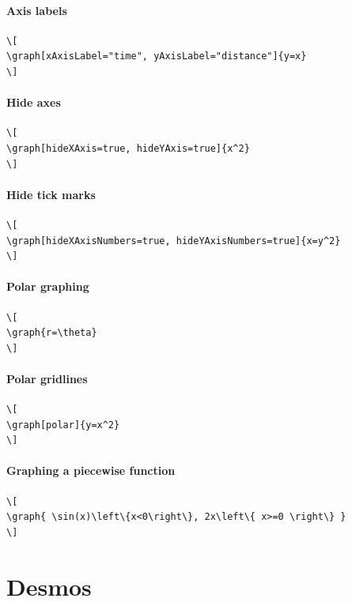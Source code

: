 \documentclass{ximera}
\begin{document}
\paragraph{Axis labels}

\begin{verbatim}
\[
\graph[xAxisLabel="time", yAxisLabel="distance"]{y=x}
\]
\end{verbatim}
\paragraph{Hide axes}

\begin{verbatim}
\[
\graph[hideXAxis=true, hideYAxis=true]{x^2}
\]
\end{verbatim}
\paragraph{Hide tick marks}

\begin{verbatim}
\[
\graph[hideXAxisNumbers=true, hideYAxisNumbers=true]{x=y^2}
\]
\end{verbatim}
\paragraph{Polar graphing}

\begin{verbatim}
\[
\graph{r=\theta}
\]
\end{verbatim}
\paragraph{Polar gridlines}

\begin{verbatim}
\[
\graph[polar]{y=x^2}
\]
\end{verbatim}
\paragraph{Graphing a piecewise function}

\begin{verbatim}
\[
\graph{ \sin(x)\left\{x<0\right\}, 2x\left\{ x>=0 \right\} }
\]
\end{verbatim}

\section{Desmos}
\end{document}
